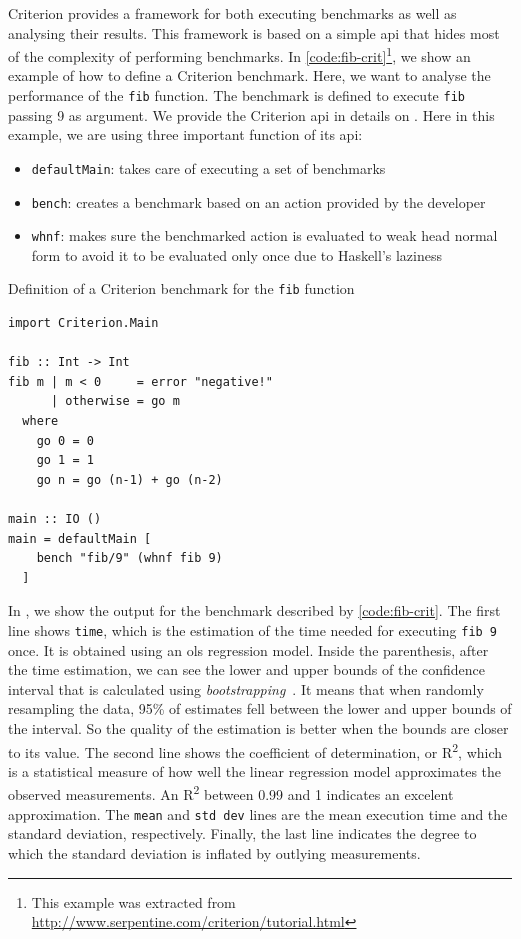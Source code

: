 Criterion provides a framework for both executing benchmarks as well as analysing their results. This framework is based on a simple \ac{api} that hides most of the complexity of performing benchmarks. In \autoref{code:fib-crit}\footnote{This example was extracted from \url{http://www.serpentine.com/criterion/tutorial.html}}, we show an example of how to define a Criterion benchmark. Here, we want to analyse the performance of the \texttt{fib} function. The benchmark is defined to execute \texttt{fib} passing 9 as argument. We provide the Criterion \ac{api} in details on . Here in this example, we are using three important function of its \ac{api}:
\begin{itemize}
  \item \texttt{defaultMain}: takes care of executing a set of benchmarks
  \item \texttt{bench}: creates a benchmark based on an action provided by the developer
  \item \texttt{whnf}: makes sure the benchmarked action is evaluated to weak head normal form to avoid it to be evaluated only once due to Haskell's laziness
\end{itemize}

\begin{listing}
  \caption{Definition of a Criterion benchmark for the \texttt{fib} function}
  \begin{verbatim}
import Criterion.Main

fib :: Int -> Int
fib m | m < 0     = error "negative!"
      | otherwise = go m
  where
    go 0 = 0
    go 1 = 1
    go n = go (n-1) + go (n-2)

main :: IO ()
main = defaultMain [
    bench "fib/9" (whnf fib 9)
  ]
  \end{verbatim}
  \label{code:fib-crit}
\end{listing}

In , we show the output for the benchmark described by \autoref{code:fib-crit}. The first line shows \texttt{time}, which is the estimation of the time needed for executing \texttt{fib 9} once. It is obtained using an \ac{ols} regression model. Inside the parenthesis, after the time estimation, we can see the lower and upper bounds of the confidence interval that is calculated using \emph{bootstrapping}~\citep{davison:1997}. It means that when randomly resampling the data, 95\% of estimates fell between the lower and upper bounds of the interval. So the quality of the estimation is better when the bounds are closer to its value. The second line shows the coefficient of determination, or R\textsuperscript{2}, which is a statistical measure of how well the linear regression model approximates the observed measurements. An R\textsuperscript{2} between 0.99 and 1 indicates an excelent approximation. The \texttt{mean} and \texttt{std dev} lines are the mean execution time and the standard deviation, respectively. Finally, the last line indicates the degree to which the standard deviation is inflated by outlying measurements.

